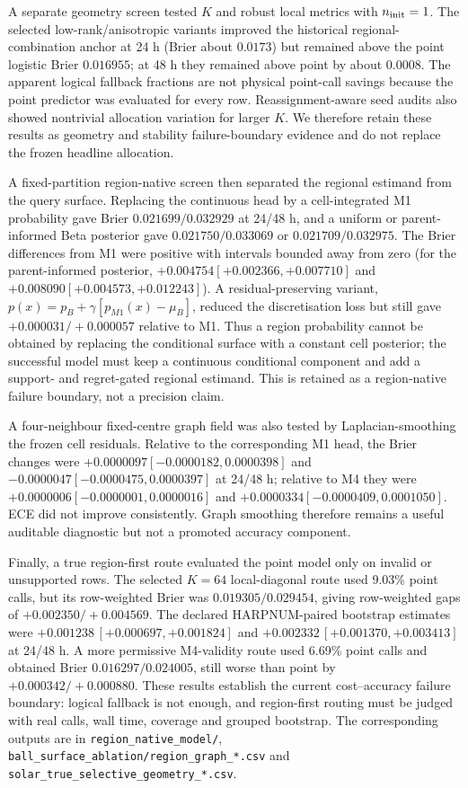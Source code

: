 \documentclass[11pt,a4paper]{article}
\numberwithin{equation}{section}
\theoremstyle{definition}\newtheorem{definition}[theorem]{Definition}
\theoremstyle{remark}\newtheorem{remark}[theorem]{Remark}
\begin{document}
A separate geometry screen tested $K$ and robust local metrics with $n_{\rm init}=1$. The selected low-rank/anisotropic variants improved the historical regional-combination anchor at 24 h (Brier about $0.0173$) but remained above the point logistic Brier $0.016955$; at 48 h they remained above point by about $0.0008$. The apparent logical fallback fractions are not physical point-call savings because the point predictor was evaluated for every row. Reassignment-aware seed audits also showed nontrivial allocation variation for larger $K$. We therefore retain these results as geometry and stability failure-boundary evidence and do not replace the frozen headline allocation.

A fixed-partition region-native screen then separated the regional estimand from the query surface. Replacing the continuous head by a cell-integrated M1 probability gave Brier $0.021699/0.032929$ at 24/48 h, and a uniform or parent-informed Beta posterior gave $0.021750/0.033069$ or $0.021709/0.032975$. The Brier differences from M1 were positive with intervals bounded away from zero (for the parent-informed posterior, $+0.004754[+0.002366,+0.007710]$ and $+0.008090[+0.004573,+0.012243]$). A residual-preserving variant, $p(x)=p_B+\gamma[p_{M1}(x)-\mu_B]$, reduced the discretisation loss but still gave $+0.000031/+0.000057$ relative to M1. Thus a region probability cannot be obtained by replacing the conditional surface with a constant cell posterior; the successful model must keep a continuous conditional component and add a support- and regret-gated regional estimand. This is retained as a region-native failure boundary, not a precision claim.

A four-neighbour fixed-centre graph field was also tested by Laplacian-smoothing the frozen cell residuals. Relative to the corresponding M1 head, the Brier changes were $+0.0000097[-0.0000182,0.0000398]$ and $-0.0000047[-0.0000475,0.0000397]$ at 24/48 h; relative to M4 they were $+0.0000006[-0.0000001,0.0000016]$ and $+0.0000334[-0.0000409,0.0001050]$. ECE did not improve consistently. Graph smoothing therefore remains a useful auditable diagnostic but not a promoted accuracy component.

Finally, a true region-first route evaluated the point model only on invalid or unsupported rows. The selected $K=64$ local-diagonal route used 9.03\% point calls, but its row-weighted Brier was $0.019305/0.029454$, giving row-weighted gaps of $+0.002350/+0.004569$. The declared HARPNUM-paired bootstrap estimates were $+0.001238\,[+0.000697,+0.001824]$ and $+0.002332\,[+0.001370,+0.003413]$ at 24/48 h. A more permissive M4-validity route used 6.69\% point calls and obtained Brier $0.016297/0.024005$, still worse than point by $+0.000342/+0.000880$. These results establish the current cost--accuracy failure boundary: logical fallback is not enough, and region-first routing must be judged with real calls, wall time, coverage and grouped bootstrap. The corresponding outputs are in \texttt{region\_native\_model/}, \texttt{ball\_surface\_ablation/region\_graph\_*.csv} and \texttt{solar\_true\_selective\_geometry\_*.csv}.
\end{document}
